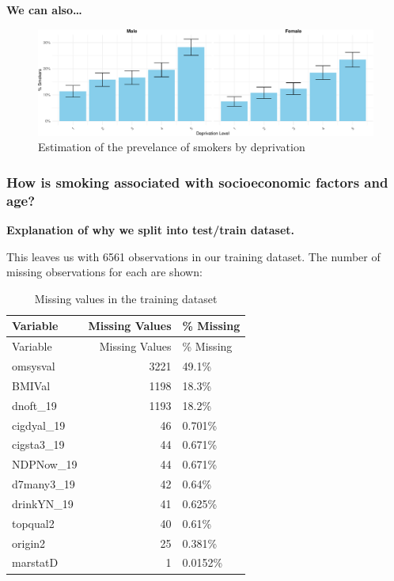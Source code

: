 \documentclass[
  11pt,
]{article}
\begin{document}
\textbf{We can also\ldots{}}

\begin{figure}[H]
\includegraphics{Coursework_files/figure-latex/output prevelance plot-1} \caption{Estimation of the prevelance of smokers by deprivation}\label{fig:output prevelance plot}
\end{figure}

\subsubsection{How is smoking associated with socioeconomic factors and
age?}\label{how-is-smoking-associated-with-socioeconomic-factors-and-age}

\textbf{Explanation of why we split into test/train dataset.}

This leaves us with 6561 observations in our training dataset. The
number of missing observations for each are shown:

\begin{longtable}[]{@{}lrl@{}}
\caption{Missing values in the training dataset}\tabularnewline
\toprule\noalign{}
Variable & Missing Values & \% Missing \\
\midrule\noalign{}
\endfirsthead
\toprule\noalign{}
Variable & Missing Values & \% Missing \\
\midrule\noalign{}
\endhead
\bottomrule\noalign{}
\endlastfoot
omsysval & 3221 & 49.1\% \\
BMIVal & 1198 & 18.3\% \\
dnoft\_19 & 1193 & 18.2\% \\
cigdyal\_19 & 46 & 0.701\% \\
cigsta3\_19 & 44 & 0.671\% \\
NDPNow\_19 & 44 & 0.671\% \\
d7many3\_19 & 42 & 0.64\% \\
drinkYN\_19 & 41 & 0.625\% \\
topqual2 & 40 & 0.61\% \\
origin2 & 25 & 0.381\% \\
marstatD & 1 & 0.0152\% \\
\end{longtable}
\end{document}
